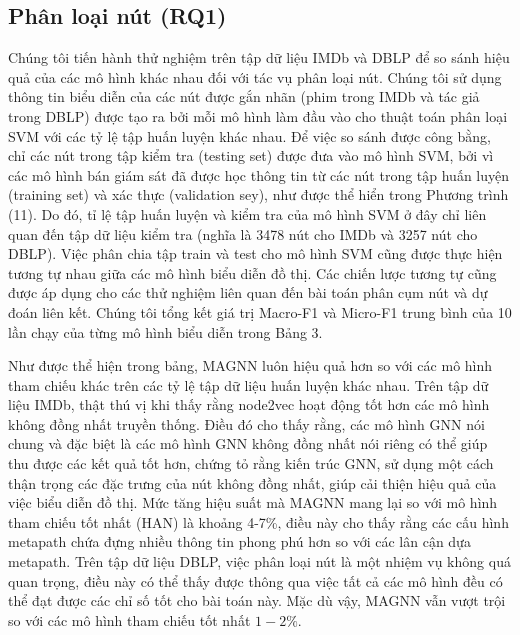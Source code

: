\subsection{Phân loại nút (RQ1)}
Chúng tôi tiến hành thử nghiệm trên tập dữ liệu IMDb và DBLP để so sánh hiệu quả của các mô hình khác nhau đối với tác vụ phân loại nút. Chúng tôi sử dụng thông tin biểu diễn của các nút được gắn nhãn (phim trong IMDb và tác giả trong DBLP) được tạo ra bởi mỗi mô hình làm đầu vào cho thuật toán phân loại SVM với các tỷ lệ tập huấn luyện khác nhau. Để việc so sánh được công bằng, chỉ các nút trong tập kiểm tra (testing set) được đưa vào mô hình SVM, bởi vì các mô hình bán giám sát đã được học thông tin từ các nút trong tập huấn luyện (training set) và xác thực (validation sey), như được thể hiển trong Phương trình (11). Do đó, tỉ lệ tập huấn luyện và kiểm tra của mô hình SVM ở đây chỉ liên quan đến tập dữ liệu kiểm tra (nghĩa là 3478 nút cho IMDb và 3257 nút cho DBLP). Việc phân chia tập train và test cho mô hình SVM cũng được thực hiện tương tự nhau giữa các mô hình biểu diễn đồ thị. Các chiến lược tương tự cũng được áp dụng cho các thử nghiệm liên quan đến bài toán phân cụm nút và dự đoán liên kết. Chúng tôi tổng kết giá trị Macro-F1 và Micro-F1 trung bình của 10 lần chạy của từng mô hình biểu diễn trong Bảng 3.

Như được thể hiện trong bảng, MAGNN luôn hiệu quả hơn so với các mô hình tham chiếu khác trên các tỷ lệ tập dữ liệu huấn luyện khác nhau. Trên tập dữ liệu IMDb, thật thú vị khi thấy rằng node2vec hoạt động tốt hơn các mô hình không đồng nhất truyền thống. Điều đó cho thấy rằng, các mô hình GNN nói chung và đặc biệt là các mô hình GNN không đồng nhất nói riêng có thể giúp thu được các kết quả tốt hơn, chứng tỏ rằng kiến trúc GNN, sử dụng một cách thận trọng các đặc trưng của nút không đồng nhất, giúp cải thiện hiệu quả của việc biểu diễn đồ thị. Mức tăng hiệu suất mà MAGNN mang lại so với mô hình tham chiếu tốt nhất (HAN) là khoảng 4-7\%, điều này cho thấy rằng các cấu hình metapath chứa đựng nhiều thông tin phong phú hơn so với các lân cận dựa metapath. Trên tập dữ liệu DBLP, việc phân loại nút là một nhiệm vụ không quá quan trọng, điều này có thể thấy được thông qua việc tất cả các mô hình đều có thể đạt được các chỉ số tốt cho bài toán này. Mặc dù vậy, MAGNN vẫn vượt trội so với các mô hình tham chiếu tốt nhất $1-2 \%$.

